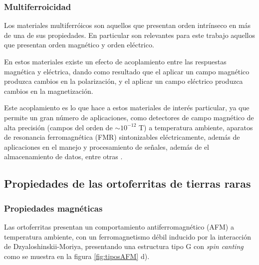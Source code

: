 \documentclass[../main.tex]{subfiles}
\begin{document}
\subsubsection{Multiferroicidad} \label{sec:multif}
Los materiales multiferróicos son aquellos que presentan orden intrínseco en más de una de sus propiedades. En particular son relevantes para este trabajo aquellos que presentan orden magnético y orden eléctrico.

En estos materiales existe un efecto de acoplamiento entre las respuestas magnética y eléctrica, dando como resultado que el aplicar un campo magnético produzca cambios en la polarización, y el aplicar un campo eléctrico produzca cambios en la magnetización.

Este acoplamiento es lo que hace a estos materiales de interés particular, ya que permite un gran número de aplicaciones, como detectores de campo magnético de alta precisión (campos del orden de $\sim10^{-12}$ T) a temperatura ambiente, aparatos de resonancia ferromagnética (FMR) sintonizables eléctricamente, además de aplicaciones en el manejo y procesamiento de señales, además de el almacenamiento de datos, entre otras \cite{Vopson2015}.
\subsection{Propiedades de las ortoferritas de tierras raras}
\subsubsection{Propiedades magnéticas}
Las ortoferritas  presentan un comportamiento antiferromagnético (AFM) a temperatura ambiente, con un ferromagnetismo débil inducido por la interacción de Dzyaloshinskii-Moriya, presentando una estructura tipo G con \textit{spin canting} como se muestra en la figura \ref{fig:tiposAFM} d).
\end{document}
